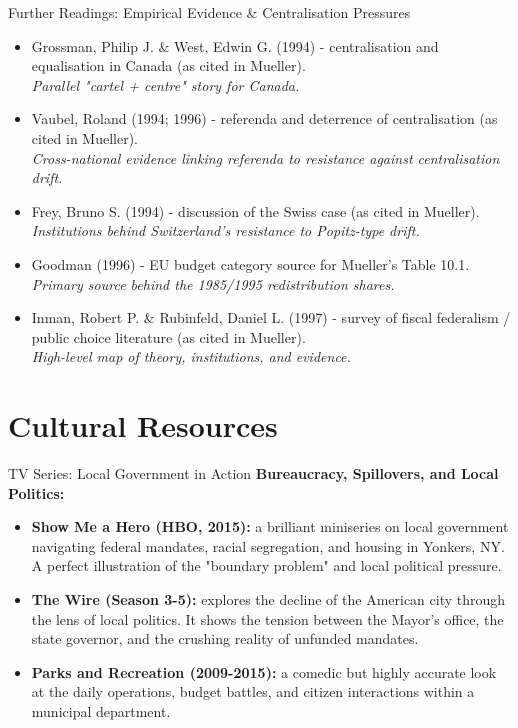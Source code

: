 \documentclass[10pt]{beamer}
\begin{document}
\begin{frame}[allowframebreaks]{Further Readings: Empirical Evidence \& Centralisation Pressures}
\begin{itemize}
\item Grossman, Philip J. \& West, Edwin G. (1994) - centralisation and equalisation in Canada (as cited in Mueller).\\
\textit{Parallel "cartel + centre" story for Canada.}

\item Vaubel, Roland (1994; 1996) - referenda and deterrence of centralisation (as cited in Mueller).\\
\textit{Cross-national evidence linking referenda to resistance against centralisation drift.}

\item Frey, Bruno S. (1994) - discussion of the Swiss case (as cited in Mueller).\\
\textit{Institutions behind Switzerland's resistance to Popitz-type drift.}

\item Goodman (1996) - EU budget category source for Mueller's Table 10.1.\\
\textit{Primary source behind the 1985/1995 redistribution shares.}

\item Inman, Robert P. \& Rubinfeld, Daniel L. (1997) - survey of fiscal federalism / public choice literature (as cited in Mueller).\\
\textit{High-level map of theory, institutions, and evidence.}

\end{itemize}
\end{frame}

\section*{Cultural Resources}

\begin{frame}{TV Series: Local Government in Action}
\textbf{Bureaucracy, Spillovers, and Local Politics:}
\begin{itemize}
\item \textbf{Show Me a Hero (HBO, 2015):} a brilliant miniseries on local government navigating federal mandates, racial segregation, and housing in Yonkers, NY. A perfect illustration of the "boundary problem" and local political pressure.
\item \textbf{The Wire (Season 3-5):} explores the decline of the American city through the lens of local politics. It shows the tension between the Mayor's office, the state governor, and the crushing reality of unfunded mandates.
\item \textbf{Parks and Recreation (2009-2015):} a comedic but highly accurate look at the daily operations, budget battles, and citizen interactions within a municipal department.
\end{itemize}
\end{frame}
\end{document}
